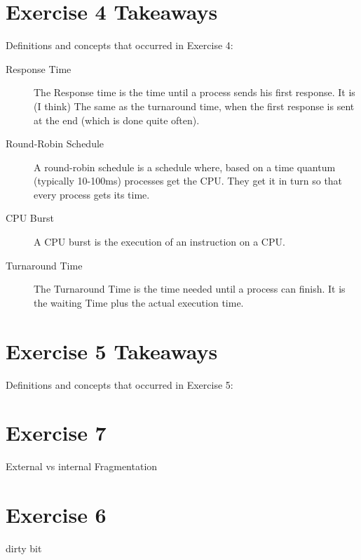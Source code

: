 \documentclass{article}
\begin{document}
	\section*{Exercise 4 Takeaways}
   Definitions and concepts that occurred in Exercise 4:
	\begin{description}
		\item[Response Time] The Response time is the time until a process sends his first response. It is (I think) The same as the turnaround time, when the first response is sent at the end (which is done quite often).
		
		\item[Round-Robin Schedule] A round-robin schedule is a schedule where, based on a time quantum (typically 10-100ms) processes get the CPU. They get it in turn so that every process gets its time. 
		\item[CPU Burst] A CPU burst is the execution of an instruction on a CPU. 
		
		\item[Turnaround Time] The Turnaround Time is the time needed until a process can finish. It is the waiting Time plus the actual execution time. 
	\end{description}
	
	\section*{Exercise 5 Takeaways}
   Definitions and concepts that occurred in Exercise 5:	
   
   \section{Exercise 7}
   \begin{description}
   	\item[External vs internal Fragmentation]
   
   \end{description}
	\section*{Exercise 6}
	\begin{description}
		\item[dirty bit]
	\end{description}


 
\end{document}
